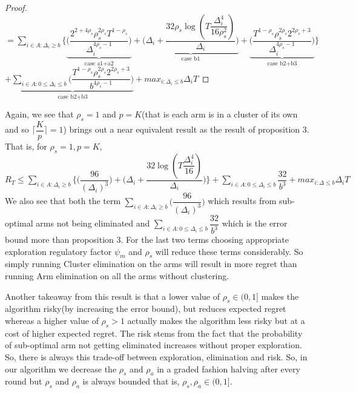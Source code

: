 \begin{proof}
\newline$= \sum_{i\in A:\Delta_{i}\geq b}\bigg\lbrace\underbrace{\bigg(\dfrac{2^{2+4\rho_{s}}\rho_{s}^{2\rho_{s}}T^{1-\rho_{s}}}{\Delta_{i}^{4\rho_{s}-1}}\bigg)}_{\text{case a1+a2}} + \underbrace{\bigg(\Delta_{i}+\dfrac{32\rho_{s}\log{(T\dfrac{\Delta_{i}^{4}}{16\rho_{s}^{2}})}}{\Delta_{i}}\bigg)}_{\text{case b1}}  +  \underbrace{\bigg(\dfrac{T^{1-\rho_{s}}\rho_{s}^{2\rho_{s}}2^{2\rho_{s}+3}}{\Delta_{i}^{4\rho_{s} -1}} \bigg)}_{\text{case b2+b3}}\bigg \rbrace$\newline$+\underbrace{\sum_{i\in A:0\leq\Delta_{i}\leq b}\bigg(\dfrac{T^{1-\rho_{s}}\rho_{s}^{2\rho_{s}}2^{2\rho_{s}+3}}{b^{4\rho_{s} -1}} \bigg)}_{\text{case b2+b3}} + max_{i:\Delta_{i}\leq b}\Delta_{i}T$
\end{proof}

\begin{remark}
\label{App:B:Rem:2}
	Again, we see that $\rho_{s}=1$ and $p=K$(that is each arm is in a cluster of its own and so $\bigg\lceil \dfrac{K}{p} \bigg\rceil=1$) brings out a near equivalent result as the result of proposition $3$. That is, for $\rho_{s}=1,p=K$,
\newline $R_{T}\leq \sum_{i\in A:\Delta_{i}\geq b}\bigg \lbrace \bigg(\dfrac{96}{(\Delta_{i})^{3}}\bigg) + \bigg(\Delta_{i}+\dfrac{32\log{(T\dfrac{\Delta_{i}^{4}}{16})}}{\Delta_{i}}\bigg)\bigg\rbrace + \sum_{i\in A:0\leq\Delta_{i}\leq b}\dfrac{32}{b^{3}} + max_{i:\Delta\leq b}\Delta_{i}T$
\newline We also see that both the term $\sum_{i\in A:\Delta_{i}\geq b}\bigg(\dfrac{96}{(\Delta_{i})^{3}}\bigg)$ which results from sub-optimal arms not being eliminated and $\sum_{i\in A:0\leq\Delta_{i}\leq b}\dfrac{32}{b^{3}}$ which is the error bound more than proposition $3$. For the last two terms choosing appropriate exploration regulatory factor $\psi_{m}$ and $\rho_{s}$ will reduce these terms considerably. So simply running Cluster elimination on the arms will result in more regret than running Arm elimination on all the arms without clustering.
\par Another takeaway from this result is that a lower value of $\rho_{s}\in (0,1]$ makes the algorithm risky(by increasing the error bound), but reduces expected regret whereas a higher value of $\rho_{s} > 1$ actually makes the algorithm less risky but at a cost of higher expected regret. The risk stems from the fact that the probability of sub-optimal arm not getting eliminated increases without proper exploration. So, there is always this trade-off between exploration, elimination and risk. So, in our algorithm we decrease the $\rho_{s}$ and $\rho_{a}$ in a graded fashion halving after every round but $\rho_{s}$ and $\rho_{a}$ is always bounded that is, $\rho_{s},\rho_{a} \in (0,1]$.
\end{remark}

